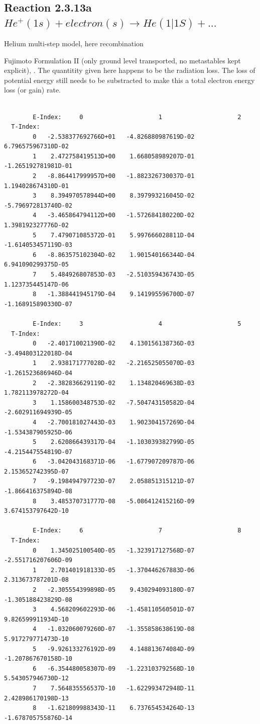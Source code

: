 \documentclass[12pt,dvips]{article}
\begin{document}
\subsection{
Reaction 2.3.13a $He^+(1s) + electron(s) \rightarrow   He(1|1S)+ ...$
}
Helium multi-step model, here recombination

 Fujimoto Formulation II (only ground level transported, no metastables
 kept explicit), \cite{kn:Fujimoto}.
 The quantitity given here happens to be the radiation loss.
 The loss of potential energy still needs to be substracted to make
 this a total electron energy loss (or gain) rate.



\begin{small}\begin{verbatim}

        E-Index:     0                     1                     2
  T-Index:
        0   -2.538377692766D+01   -4.826880987619D-02    6.796575967310D-02
        1    2.472758419513D+00    1.668058989207D-01   -1.265192781981D-01
        2   -8.864417999957D+00   -1.882326730037D-01    1.194028674310D-01
        3    8.394970578944D+00    8.397993216045D-02   -5.796972813740D-02
        4   -3.465864794112D+00   -1.572684180220D-02    1.398192327776D-02
        5    7.479071085372D-01    5.997666028811D-04   -1.614053457119D-03
        6   -8.863575102304D-02    1.901540166344D-04    6.941090299375D-05
        7    5.484926807853D-03   -2.510359436743D-05    1.123735445147D-06
        8   -1.388441945179D-04    9.141995596700D-07   -1.168915890330D-07

        E-Index:     3                     4                     5
  T-Index:
        0   -2.401710021390D-02    4.130156138736D-03   -3.494803122018D-04
        1    2.938171777028D-02   -2.216525055070D-03   -1.261523686946D-04
        2   -2.382836629119D-02    1.134820469638D-03    1.782113978272D-04
        3    1.158600348753D-02   -7.504743150582D-04   -2.602911694939D-05
        4   -2.700181027443D-03    1.902304157269D-04   -1.534387905925D-06
        5    2.620866439317D-04   -1.103039382799D-05   -4.215447554819D-07
        6   -3.042043168371D-06   -1.677907209787D-06    2.153652742395D-07
        7   -9.198494797723D-07    2.058851315121D-07   -1.866416375894D-08
        8    3.485370731777D-08   -5.086412415216D-09    3.674153797642D-10

        E-Index:     6                     7                     8
  T-Index:
        0    1.345025100540D-05   -1.323917127568D-07   -2.551716207606D-09
        1    2.701401918133D-05   -1.370446267883D-06    2.313673787201D-08
        2   -2.305554399898D-05    9.430294093180D-07   -1.305188423829D-08
        3    4.568209602293D-06   -1.458110560501D-07    9.826599911934D-10
        4   -1.032060079260D-07   -1.355858638619D-08    5.917279771473D-10
        5   -9.926133276192D-09    4.148813674084D-09   -1.207867670158D-10
        6   -6.354480058307D-09   -1.223103792568D-10    5.543057946730D-12
        7    7.564835556537D-10   -1.622993472948D-11    2.428986170198D-13
        8   -1.621809988343D-11    6.737654534264D-13   -1.678705755876D-14


\end{verbatim}
\end{small}
\end{document}
